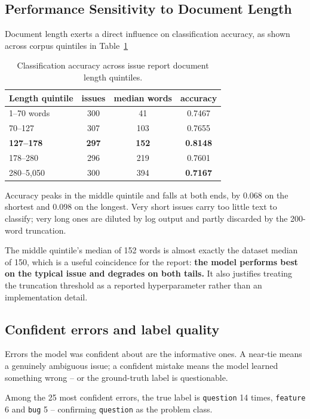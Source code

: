 \subsection{Performance Sensitivity to Document Length}
Document length exerts a direct influence on classification accuracy, as shown across corpus quintiles in Table~\ref{tab:length_quintiles_accuracy}
\begin{table}[H]
\centering
\caption{Classification accuracy across issue report document length quintiles.}
\label{tab:length_quintiles_accuracy}
\vspace{0.5em}
\begin{tabular}{l c c c}
\hline
Length quintile & issues & median words & accuracy \\
\hline
1--70 words & 300 & 41 & 0.7467 \\
70--127 & 307 & 103 & 0.7655 \\
\textbf{127--178} & \textbf{297} & \textbf{152} & \textbf{0.8148} \\
178--280 & 296 & 219 & 0.7601 \\
280--5,050 & 300 & 394 & \textbf{0.7167} \\
\hline
\end{tabular}
\end{table}

Accuracy peaks in the middle quintile and falls at both ends, by 0.068 on the shortest and 0.098 on the longest. Very short issues carry too little text to classify; very long ones are diluted by log output and partly discarded by the 200-word truncation.

The middle quintile's median of 152 words is almost exactly the dataset median of 150, which is a useful coincidence for the report: \textbf{the model performs best on the typical issue and degrades on both tails.} It also justifies treating the truncation threshold as a reported hyperparameter rather than an implementation detail.

\subsection{Confident errors and label quality}

Errors the model was confident about are the informative ones. A near-tie means a genuinely ambiguous issue; a confident mistake means the model learned something wrong -- or the ground-truth label is questionable.

Among the 25 most confident errors, the true label is \texttt{question} 14 times, \texttt{feature} 6 and \texttt{bug} 5 -- confirming \texttt{question} as the problem class.


